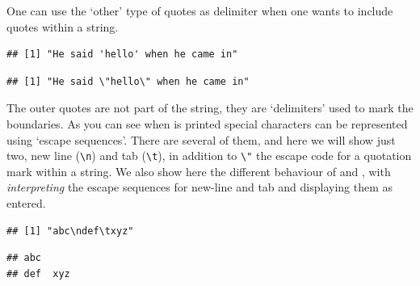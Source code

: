 \documentclass[krantz2]{krantz}\usepackage{knitr}%
\begin{document}
One can use the `other' type of quotes as delimiter when one wants to include quotes within a string.

\begin{knitrout}\footnotesize
{}\color{fgcolor}\begin{kframe}
\begin{alltt}
 \hlkwb{<-} 
\end{alltt}
\begin{verbatim}
## [1] "He said 'hello' when he came in"
\end{verbatim}
\begin{alltt}
 \hlkwb{<-} 
\end{alltt}
\begin{verbatim}
## [1] "He said \"hello\" when he came in"
\end{verbatim}
\end{kframe}
\end{knitrout}

The outer quotes are not part of the string, they are `delimiters' used to mark the boundaries. As you can see when  is printed special characters can be represented using `escape sequences'. There are several of them, and here we will show just two, new line (\verb|\n|) and tab (\verb|\t|), in addition to \verb|\"| the escape code for a quotation mark within a string. We also show here the different behaviour of  and , with  \emph{interpreting} the escape sequences for new-line and tab and  displaying them as entered.

\begin{knitrout}\footnotesize
{}\color{fgcolor}\begin{kframe}
\begin{alltt}
 \hlkwb{<-} 
\end{alltt}
\begin{verbatim}
## [1] "abc\ndef\txyz"
\end{verbatim}
\begin{alltt}
\end{alltt}
\begin{verbatim}
## abc
## def	xyz
\end{verbatim}
\end{kframe}
\end{knitrout}
\end{document}
